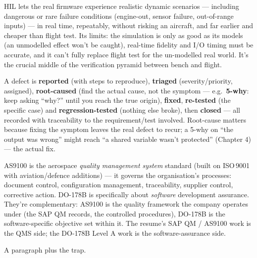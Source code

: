 HIL lets the real firmware experience realistic dynamic scenarios --- including
dangerous or rare failure conditions (engine-out, sensor failure, out-of-range
inputs) --- in real time, repeatably, without risking an aircraft, and far
earlier and cheaper than flight test. Its limits: the simulation is only as good
as its models (an unmodelled effect won't be caught), real-time fidelity and I/O
timing must be accurate, and it can't fully replace flight test for the
un-modelled real world. It's the crucial middle of the verification pyramid
between bench and flight.

A defect is \textbf{reported} (with steps to reproduce), \textbf{triaged}
(severity/priority, assigned), \textbf{root-caused} (find the actual cause, not
the symptom --- e.g.\ \textbf{5-why}: keep asking ``why?'' until you reach the
true origin), \textbf{fixed}, \textbf{re-tested} (the specific case) and
\textbf{regression-tested} (nothing else broke), then \textbf{closed} --- all
recorded with traceability to the requirement/test involved. Root-cause matters
because fixing the symptom leaves the real defect to recur; a 5-why on ``the
output was wrong'' might reach ``a shared variable wasn't protected'' (Chapter 4)
--- the actual fix.

AS9100 is the aerospace \emph{quality management system} standard (built on
ISO\,9001 with aviation/defence additions) --- it governs the organisation's
processes: document control, configuration management, traceability, supplier
control, corrective action. DO-178B is specifically about \emph{software}
development assurance. They're complementary: AS9100 is the quality framework the
company operates under (the SAP QM records, the controlled procedures), DO-178B
is the software-specific objective set within it. The resume's SAP QM /
AS9100 work is the QMS side; the DO-178B Level A work is the software-assurance
side.

%
{A paragraph plus the trap.}

